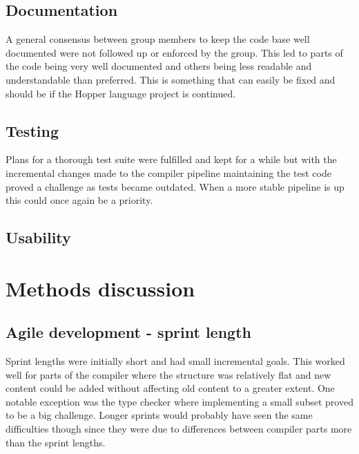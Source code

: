 

\subsection{Documentation}

A general consensus between group members to keep the code base well documented were not followed up or enforced by the group. This led to parts of the code being very well documented and others being less readable and understandable than preferred. This is something that can easily be fixed and should be if the Hopper language project is continued.

\subsection{Testing}

Plans for a thorough test suite were fulfilled and kept for a while but with the incremental changes made to the compiler pipeline maintaining the test code proved a challenge as tests became outdated. When a more stable pipeline is up this could once again be a priority.

\subsection{Usability}




\section{Methods discussion}

\subsection{Agile development - sprint length}

Sprint lengths were initially short and had small incremental goals. This worked well for parts of the compiler where the structure was relatively flat and new content could be added without affecting old content to a greater extent. One notable exception was the type checker where implementing a small subset proved to be a big challenge. Longer sprints would probably have seen the same difficulties though since they were due to differences between compiler parts more than the sprint lengths.

